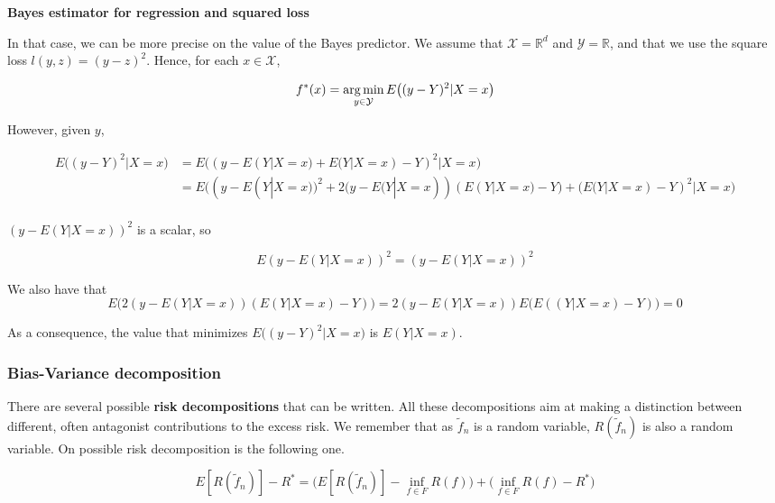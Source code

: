 \documentclass[
10pt, %
a4paper, %
oneside, %
headinclude,footinclude, %
BCOR5mm, %
]{scrartcl}
\begin{document}
    \textbf{{Bayes estimator for regression and squared loss}} 

    In that case, we can be more precise on the value of the Bayes predictor. We assume that $ \mathcal{X} = \mathbb{R}^d$ and $ \mathcal{Y}= \mathbb{R} $, and that we use the square loss $l(y,z)=(y-z)^2$. Hence, for each $x\in \mathcal{X} $,

\begin{equation*}
    f^*(x)= \operatorname*{arg\,min}_{y\in \mathcal{Y} }E\big((y-Y)^2 |X=x\big)
\end{equation*}

However, given $y$,

\begin{equation*}
    \begin{aligned}
	E\big((y-Y)^2 |X=x\big)&= E\big((y-E(Y|X=x)+E(Y|X=x)-Y)^2 |X=x\big)\\
	&=E\big((y-E(Y|X=x))^2+2(y-E(Y|X=x))(E(Y|X=x)-Y)+(E(Y|X=x)-Y)^2 |X=x\big)\\
    \end{aligned}
\end{equation*}

    $(y-E(Y|X=x))^2$  is a scalar, so 

\begin{equation*}
    E(y-E(Y|X=x))^2=(y-E(Y|X=x))^2
\end{equation*}

We also have that
\begin{equation*}
    E\big(2(y-E(Y|X=x))(E(Y|X=x)-Y)\big)=2(y-E(Y|X=x))E\big(E((Y|X=x)-Y)\big)=0
\end{equation*}

As a consequence, the value that minimizes $E\big((y-Y)^2 |X=x\big)$ is $E(Y|X=x)$.

\subsubsection{\large\color{Periwinkle}Bias-Variance decomposition}

There are several possible \textbf{{risk decompositions}} that can be written. All these decompositions aim at making a distinction between different, often antagonist contributions to the excess risk. We remember that as $ \tilde{f}_n$ is a random variable, $ R(\tilde{f}_n)$ is also a random variable. On possible risk decomposition is the following one.

\begin{equation*}
    E[R( \tilde{f}_n)]-R^* = \Big(E[R( \tilde{f}_n)]- \inf_{f\in F}R(f)\Big) +\Big(\inf_{f\in F}R(f)-R^* \Big)
\end{equation*}
\end{document}
